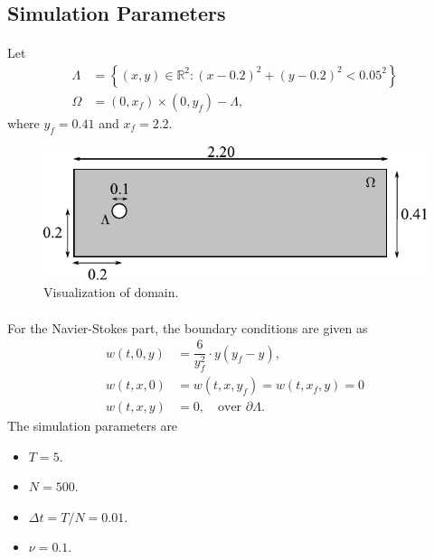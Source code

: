 \documentclass{beamer}
\theoremstyle{definition}
\theoremstyle{remark}
\theoremstyle{example}
\newif\ifinsection
\newif\ifinsubsection
\let\oldsubsection\subsection
\renewcommand{\subsection}{
  \global\insubsectiontrue
  \oldsubsection}
\newcommand {\aframe}[1] {
  \begin{frame}
    \ifinsection\frametitle{\secname}\fi
    \ifinsubsection\framesubtitle{\subsecname}\fi
  #1
  \end{frame}
}
\begin{document}
\subsection{Simulation Parameters}
\aframe{
  Let
  \begin{align*}
    \Lambda&=\left\{(x,y)\in\mathbb{R}^2:(x-0.2)^2 + (y-0.2)^2 < 0.05^2\right\}\\
    \Omega&=(0,x_f) \times(0,y_f) - \Lambda,
  \end{align*}
  where $y_f=0.41$ and $x_f=2.2$. \vspace{0.5cm}
  \begin{figure}
    \centering
    \includegraphics[scale=1]{figs/region.pdf}
    \caption{Visualization of domain.}
 \end{figure}
}

\aframe{For the Navier-Stokes part, the boundary conditions are given as
  \begin{align*}
    w(t, 0, y)& = \dfrac{6}{y_f^2}\cdot y(y_f-y),\\
    w(t, x, 0)& = w(t, x, y_f) = w(t, x_f, y) = 0\\
    w(t, x, y)& = 0,\quad \text{over }\partial\Lambda.
  \end{align*}
  The simulation parameters are
  \begin{itemize}
    \item $T=5$.
    \item $N=500$.
    \item $\Delta t=T/N=0.01$.
    \item $\nu=0.1$.
  \end{itemize}
}
\end{document}
